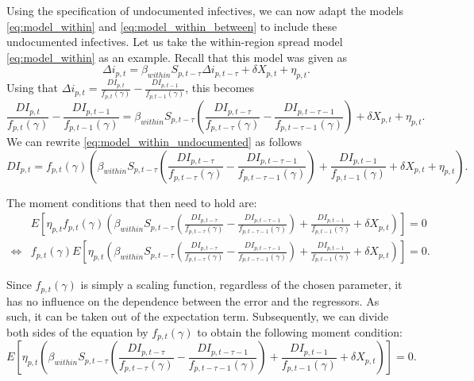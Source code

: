 \documentclass[12pt]{article}
\begin{document}
	Using the specification of undocumented infectives, we can now adapt the models \eqref{eq:model_within} and \eqref{eq:model_within_between}  to include these undocumented infectives. Let us take the within-region spread model \eqref{eq:model_within} as an example. Recall that this model was given as
	    \begin{equation*}
		    \Delta i_{p,t} = \beta_{within}S_{p,t-\tau}\Delta i_{p,t-\tau} + \delta X_{p,t} + \eta_{p,t}.
	    \end{equation*}
	Using that $\Delta i_{p,t} = \frac{DI_{p,t}}{f_{p,t}(\gamma)} - \frac{DI_{p,t-1}}{f_{p,t-1}(\gamma)}$, this becomes
	    \begin{equation} \label{eq:model_within_undocumented}
		    \frac{DI_{p,t}}{f_{p,t}(\gamma)} - \frac{DI_{p,t-1}}{f_{p,t-1}(\gamma)} = \beta_{within}S_{p,t-\tau}\left(\frac{DI_{p,t-\tau}}{f_{p,t-\tau}(\gamma)} - \frac{DI_{p,t-\tau-1}}{f_{p,t-\tau-1}(\gamma)}\right) + \delta X_{p,t} + \eta_{p,t}.
	    \end{equation}
	We can rewrite \eqref{eq:model_within_undocumented} as follows
	    \begin{equation*}
	       DI_{p,t} = f_{p,t}(\gamma)\left(\beta_{within}S_{p,t-\tau}\left(\frac{DI_{p,t-\tau}}{f_{p,t-\tau}(\gamma)} - \frac{DI_{p,t-\tau-1}}{f_{p,t-\tau-1}(\gamma)}\right) + \frac{DI_{p,t-1}}{f_{p,t-1}(\gamma)} + \delta X_{p,t} + \eta_{p,t}\right).
	    \end{equation*}
	    
	The moment conditions that then need to hold are:
	    \begin{align*}
	        & E\left[ \eta_{p,t}f_{p,t}(\gamma) \left( \beta_{within}S_{p,t-\tau}\left(\frac{DI_{p,t-\tau}}{f_{p,t-\tau}(\gamma)} - \frac{DI_{p,t-\tau-1}}{f_{p,t-\tau-1}(\gamma)}\right) + \frac{DI_{p,t-1}}{f_{p,t-1}(\gamma)} + \delta X_{p,t} \right) \right] = 0 \\
	        \iff & f_{p,t}(\gamma) E\left[ \eta_{p,t}\left( \beta_{within}S_{p,t-\tau}\left(\frac{DI_{p,t-\tau}}{f_{p,t-\tau}(\gamma)} - \frac{DI_{p,t-\tau-1}}{f_{p,t-\tau-1}(\gamma)}\right) + \frac{DI_{p,t-1}}{f_{p,t-1}(\gamma)} + \delta X_{p,t} \right) \right] = 0.
	    \end{align*}
	
	Since $f_{p,t}(\gamma)$ is simply a scaling function, regardless of the chosen parameter, it has no influence on the dependence between the error and the regressors. As such, it can be taken out of the expectation term. Subsequently, we can divide both sides of the equation by $f_{p,t}(\gamma)$ to obtain the following moment condition:
	    \begin{equation} \label{eq:model_within_undocumented_moments}
	        E\left[ \eta_{p,t}\left( \beta_{within}S_{p,t-\tau}\left(\frac{DI_{p,t-\tau}}{f_{p,t-\tau}(\gamma)} - \frac{DI_{p,t-\tau-1}}{f_{p,t-\tau-1}(\gamma)}\right) + \frac{DI_{p,t-1}}{f_{p,t-1}(\gamma)} + \delta X_{p,t} \right) \right] = 0.
	    \end{equation}
	
\end{document}
